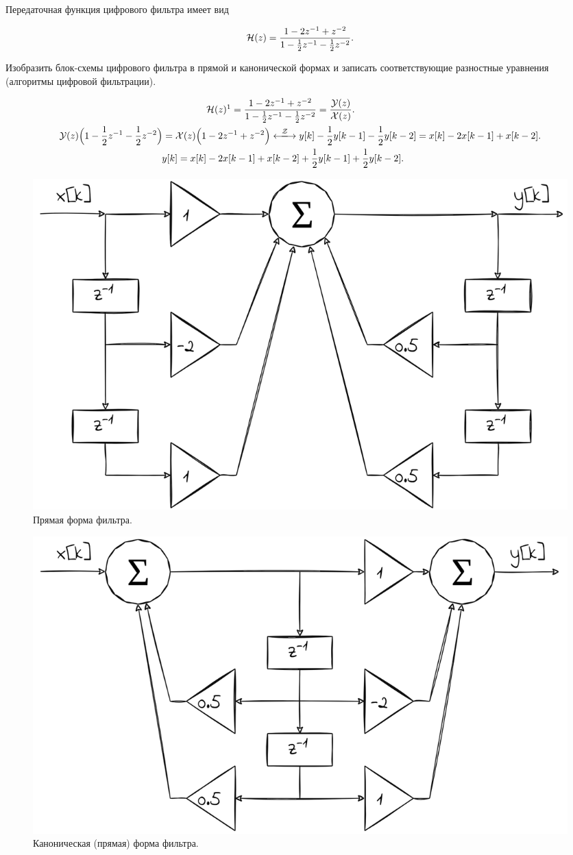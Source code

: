 \protect\thispagestyle{fancy}
\section{}
Передаточная функция цифрового фильтра имеет вид

\begin{equation*}
	\mathcal{H}(z) = \dfrac{1 - 2z^{-1} + z^{-2}}{1 - \frac{1}{2}z^{-1} - \frac{1}{2}z^{-2}}.
\end{equation*}

Изобразить блок-схемы цифрового фильтра в прямой и канонической формах и записать соответствующие разностные уравнения (алгоритмы цифровой фильтрации).

\begin{align*}
	&\Capit{H}(z)\footnotemark = \dfrac{1 - 2z^{-1} + z^{-2}}{1 - \frac{1}{2}z^{-1} - \frac{1}{2}z^{-2}} = \dfrac{\Capit{Y}(z)}{\Capit{X}(z)}.\\
	\Capit{Y}(z)\Big(1 - \frac{1}{2}z^{-1} - \frac{1}{2}z^{-2}\Big) =
	\Capit{X}(z)\Big(1 &- 2z^{-1} + z^{-2}\Big) \xlongleftrightarrow{\Capit{Z}} 
	y[k] - \dfrac{1}{2}y[k-1] - \dfrac{1}{2}y[k-2] = x[k] - 2x[k-1] + x[k-2].\\
	y[k] = x[k]& - 2x[k-1] + x[k-2] + \dfrac{1}{2}y[k-1] + \dfrac{1}{2}y[k-2].
\end{align*}

\begin{figure}[!h]
	\centering
	\includegraphics[width=0.6\columnwidth]{pics/fall/10/10-1.png}
	\caption{Прямая форма фильтра.}
	\label{fig:10-1}
\end{figure}

\begin{figure}[!h]
	\centering
	\includegraphics[width=0.6\columnwidth]{pics/fall/10/10-2.png}
	\caption{Каноническая (прямая) форма фильтра.}
	\label{fig:10-2}
\end{figure}

